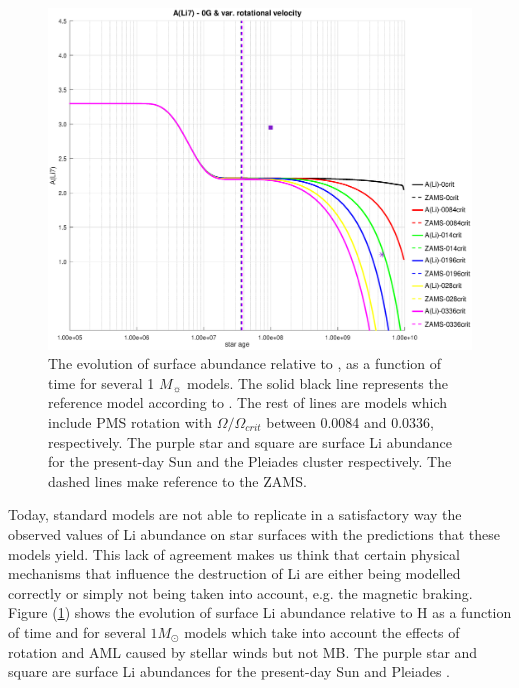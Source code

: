 \documentclass[fleqn,usenatbib]{mnras}
\begin{document}
\begin{figure}
	\includegraphics[trim = 40mm 15mm 20mm 15mm, clip, width=\columnwidth]{figures/li_var_vel_0_0g.eps}
    \caption{The evolution of surface  abundance relative to , as a function of time for several 1 $M_{\sun}$ models. The solid black line represents the reference model according to \citet{Choi2016}. The rest of lines are models which include PMS rotation with $\Omega / \Omega_{crit}$ between 0.0084 and 0.0336, respectively. The purple star and square are surface Li abundance for the present-day Sun \citep{Asplund2009} and the Pleiades cluster \citep{Sestito2005} respectively. The dashed lines make reference to the ZAMS.}
    \label{fig:li_var_vel_0g}
\end{figure}

Today, standard models are not able to replicate in a satisfactory way the observed values of Li abundance on star surfaces with the predictions that these models yield. This lack of agreement makes us think that certain physical mechanisms that influence the destruction of Li are either being modelled correctly or simply not being taken into account, e.g. the magnetic braking. Figure (\ref{fig:li_var_vel_0g}) shows the evolution of surface Li abundance relative to H as a function of time and for several $1M_{\odot}$ models which take into account the effects of rotation and AML caused by stellar winds but not MB. The purple star and square are surface Li abundances for the present-day Sun \citep{Asplund2009} and Pleiades \citep{Sestito2005}.\par
\end{document}
